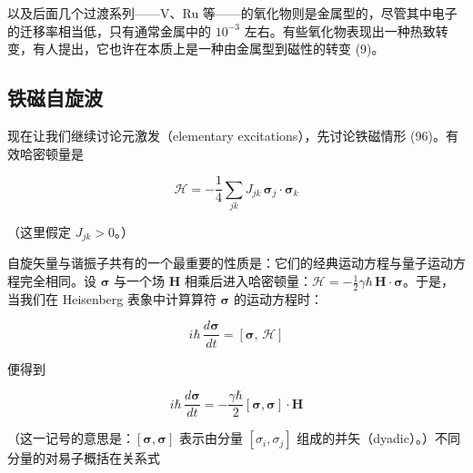 
以及后面几个过渡系列——V、Ru 等——的氧化物则是金属型的，尽管其中电子的迁移率相当低，只有通常金属中的 $10^{-3}$ 左右。有些氧化物表现出一种热致转变，有人提出，它也许在本质上是一种由金属型到磁性的转变 (9)。

\subsection{铁磁自旋波}

现在让我们继续讨论元激发（elementary excitations），先讨论铁磁情形 (96)。有效哈密顿量是

\begin{equation*}
\mathcal{H} = -\frac{1}{4} \sum_{jk} J_{jk}\, \boldsymbol{\sigma}_{j}\cdot\boldsymbol{\sigma}_{k}
\end{equation*}

（这里假定 $J_{jk} > 0$。）

自旋矢量与谐振子共有的一个最重要的性质是：它们的经典运动方程与量子运动方程完全相同。设 $\boldsymbol{\sigma}$ 与一个场 $\mathbf{H}$ 相乘后进入哈密顿量：$\mathcal{H} = -\frac{1}{2}\gamma\hbar\,\mathbf{H}\cdot\boldsymbol{\sigma}$。于是，当我们在 Heisenberg 表象中计算算符 $\boldsymbol{\sigma}$ 的运动方程时：

\begin{equation*}
i\hbar\,\frac{d\boldsymbol{\sigma}}{dt} = \left[\boldsymbol{\sigma},\, \mathcal{H}\right]
\end{equation*}

便得到

\begin{equation*}
i\hbar\,\frac{d\boldsymbol{\sigma}}{dt} = -\frac{\gamma\hbar}{2}\left[\boldsymbol{\sigma},\boldsymbol{\sigma}\right]\cdot\mathbf{H}
\end{equation*}

（这一记号的意思是：$[\boldsymbol{\sigma},\boldsymbol{\sigma}]$ 表示由分量 $[\sigma_{i},\sigma_{j}]$ 组成的并矢（dyadic）。）不同分量的对易子概括在关系式

